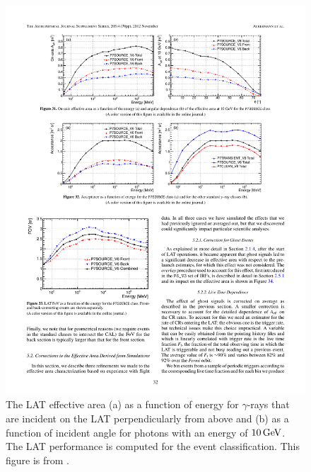 \begin{figure}[htbp]
  \centering
  \includegraphics{chapters/introduction/figures/lat_effective_area.pdf}
  \caption{
  The \ac{LAT} effective area (a) as a function of energy for
  $\gamma$-rays that are incident on the \ac{LAT} perpendicularly from
  above and (b) as a function of incident angle for photons with an
  energy of $10\,\text{GeV}$.  The \ac{LAT} performance is computed
  for the \psevensourcevsix event classification.  This figure is from
  \cite{ackermann_2012a_fermi-large}.
  }
\end{figure} 

